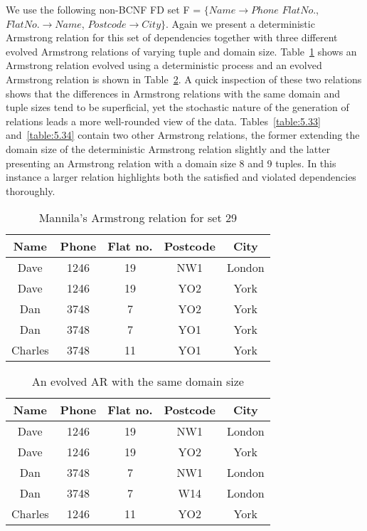 \begin{example}
\begin{rm}
We use the following non-BCNF FD set F =
$\{ Name \to Phone$ $Flat No.$, $Flat No. \to Name$, $Postcode \to City \}$.
Again we present a deterministic Armstrong relation for this set of 
dependencies together with three different evolved Armstrong relations
of varying tuple and domain size. Table~\ref{table:5.31} shows
an Armstrong relation evolved using a deterministic process and an evolved
Armstrong relation is shown in Table~\ref{table:5.32}. A quick
inspection of these two relations shows that the differences in
Armstrong relations with the same domain and tuple sizes tend to be
superficial, yet the stochastic nature of the generation of relations leads
 a more well-rounded view of the data. Tables~\ref{table:5.33}
and~\ref{table:5.34} contain two other Armstrong relations, the former 
extending the domain size of the deterministic Armstrong relation slightly and the latter
presenting an Armstrong relation with a domain size 8 and 9 tuples. In
this instance a larger relation highlights both the satisfied
and violated dependencies thoroughly. 
\end{rm}
\end{example}

{\line
\begin{table}[ht]
\begin{center}
\begin{tabular}{|c|c|c|c|c|} \hline 
{ \bf Name} & { \bf Phone} & {\bf Flat no. }  & { \bf Postcode}  & {\bf City} \\ \hline
Dave & 1246 & 19 & NW1 & London  \\
Dave & 1246 & 19 & YO2 & York \\
Dan & 3748 & 7 & YO2 & York \\
Dan & 3748 & 7 & YO1 & York \\
Charles & 3748 & 11 & YO1 & York \\ \hline
\end{tabular}
\end{center}
\caption{\label{table:5.31} Mannila's Armstrong relation for set 29 }
\end{table}
}

{\line
\begin{table}
\begin{center}
\begin{tabular}{|c|c|c|c|c|} \hline 
{ \bf Name} & { \bf Phone} & {\bf Flat no. }  & { \bf Postcode}  & {\bf City} \\ \hline
Dave & 1246 & 19 & NW1 & London  \\
Dave & 1246 & 19 & YO2 & York \\
Dan & 3748 & 7 & NW1 & London \\
Dan & 3748 & 7 & W14 & London \\
Charles & 1246 & 11 & YO2 & York \\ \hline
\end{tabular}
\end{center}
\caption{\label{table:5.32} An evolved AR with the same domain size }
\end{table}
}

